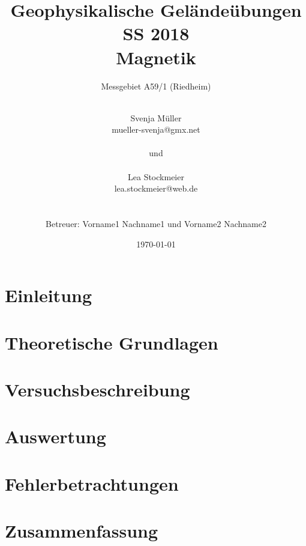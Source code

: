 \documentclass{include/protokollclass}
\title{Geophysikalische Geländeübungen \\ SS 2018 \\ Magnetik}
\subtitle{Messgebiet A59/1 (Riedheim)}
\author{\\ Svenja Müller \\ mueller-svenja@gmx.net
\\ \\und\\ \\
Lea Stockmeier \\ lea.stockmeier@web.de \\ \\ \\
Betreuer: Vorname1 Nachname1 und Vorname2 Nachname2}
\date{\vfill\vfill\vfill \today}
\begin{document}
    \FrontMatter

    \maketitle

    \begingroup \let\clearpage\relax    %
    \tableofcontents                    %
    \listoffigures
    \listoftables
    \endgroup



    \MainMatter
    
    
                                        
    \chapter{Einleitung}
    
    
    \chapter{Theoretische Grundlagen}
    
    
    \chapter{Versuchsbeschreibung}
    
    
    \chapter{Auswertung}
    
    \chapter{Fehlerbetrachtungen}
    
    
    \chapter{Zusammenfassung}
\end{document}
